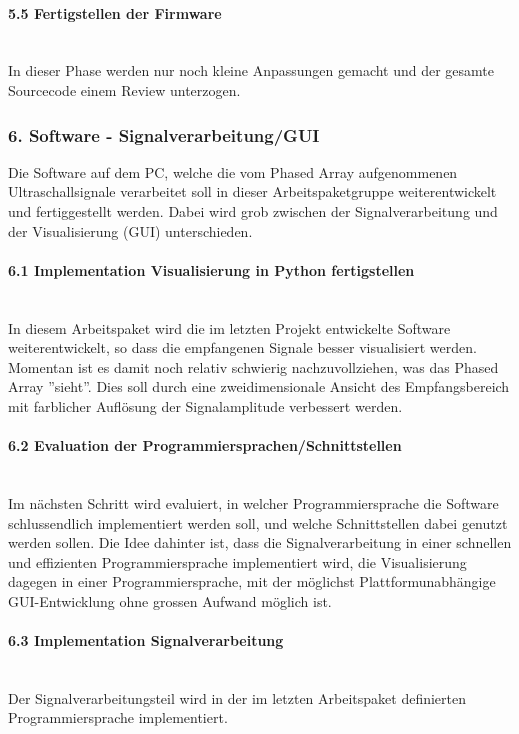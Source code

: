 \documentclass[10pt,a4paper,oneside]{99_fhnwreport}
\begin{document}
\paragraph{5.5 Fertigstellen der Firmware}\\
In dieser Phase werden nur noch kleine Anpassungen gemacht und der gesamte Sourcecode einem Review unterzogen.

\subsubsection*{6. Software - Signalverarbeitung/GUI}
Die Software auf dem PC, welche die vom Phased Array aufgenommenen Ultraschallsignale verarbeitet soll in dieser Arbeitspaketgruppe weiterentwickelt und fertiggestellt werden. Dabei wird grob zwischen der Signalverarbeitung und der Visualisierung (GUI) unterschieden.

\paragraph{6.1 Implementation Visualisierung in Python fertigstellen}\\
In diesem Arbeitspaket wird die im letzten Projekt entwickelte Software weiterentwickelt, so dass die empfangenen Signale besser visualisiert werden. Momentan ist es damit noch relativ schwierig nachzuvollziehen, was das Phased Array ''sieht''. Dies soll durch eine zweidimensionale Ansicht des Empfangsbereich mit farblicher Auflösung der Signalamplitude verbessert werden.

\paragraph{6.2 Evaluation der Programmiersprachen/Schnittstellen}\\
Im nächsten Schritt wird evaluiert, in welcher Programmiersprache die Software schlussendlich implementiert werden soll, und welche Schnittstellen dabei genutzt werden sollen. Die Idee dahinter ist, dass die Signalverarbeitung in einer schnellen und effizienten Programmiersprache implementiert wird, die Visualisierung dagegen in einer Programmiersprache, mit der möglichst Plattformunabhängige GUI-Entwicklung ohne grossen Aufwand möglich ist.

\paragraph{6.3 Implementation Signalverarbeitung}\\
Der Signalverarbeitungsteil wird in der im letzten Arbeitspaket definierten Programmiersprache implementiert.
\end{document}
